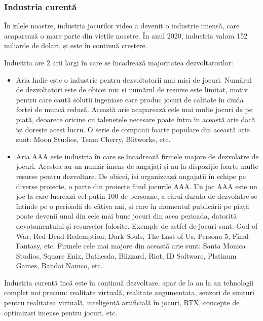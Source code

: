 \documentclass[12pt, a4paper]{article}
\begin{document}
	
	
	
	
	\subsubsection{Industria curentă}
	
	În zilele noastre, industria jocurilor video a devenit o industrie imensă, care acaparează o mare parte din viețile noastre. În anul 2020, industria valora 152 miliarde de dolari, și este în continuă creștere.
	\newline
	
	Industria are 2 arii largi în care se încadrează majoritatea dezvoltatorilor:
	
	\begin{itemize}
		\item Aria Indie este o industrie pentru dezvoltatorii mai mici de jocuri. Numărul de dezvoltatori este de obicei mic și numărul de resurse este limitat, motiv pentru care caută soluții ingeniase care produc jocuri de calitate în ciuda forței de muncă redusă. Această arie acaparează cele mai multe jocuri de pe piață, deoarece oricine cu talenetele necesare poate întra în această arie dacă își dorește acest lucru. O serie de companii foarte populare din această arie sunt: Moon Studios, Team Cherry, Blitworks, etc.
		\item Aria AAA este industria în care se încadrează firmele majore de dezvolatre de jocuri. Acestea au un număr imens de angajați și au la dispoziție foarte multe resurse pentru dezvoltare. De obicei, își organizează angajații în echipe pe diverse proiecte, o parte din proiecte fiind jocurile AAA. Un joc AAA este un joc la care lucrează cel puțin 100 de persoane, a cărui durata de dezvolatre se întinde pe o perioadă de câțiva ani, și care în momentul publicării pe piață poate devenii unul din cele mai bune jocuri din acea perioada, datorită devotamentului și resurselor folosite. Exemple de astfel de jocuri sunt: God of War, Red Dead Redemption, Dark Souls, The Last of Us, Persona 5, Final Fantasy, etc. Firmele cele mai majore din această arie sunt: Santa Monica Studios, Square Enix, Bathesda, Blizzard, Riot, ID Software, Platinum Games, Bandai Namco, etc.
	\end{itemize}
	
	Industria curentă încă este în continuă dezvoltare, apar de la an la an tehnologii complet noi precum: realitate virtuală, realitate augumentata, senzori de simțuri pentru realitatea virtuală, inteligență artificială în jocuri, RTX, concepte de optimizari imense pentru jocuri, etc.
	
\end{document}
